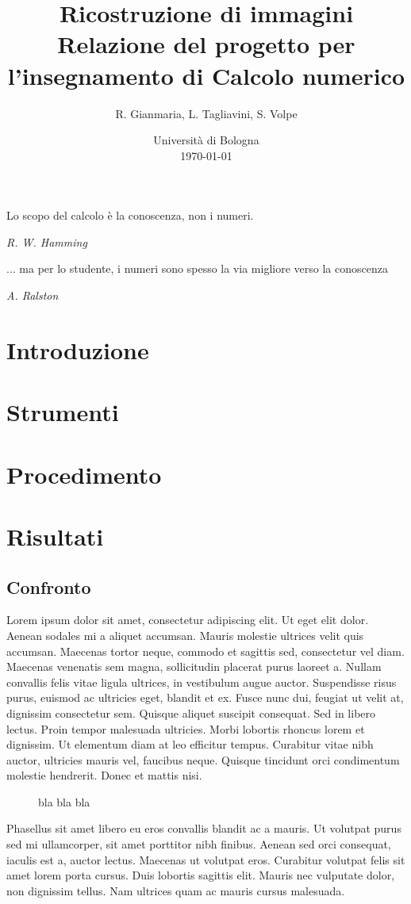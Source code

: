 \documentclass[a4paper]{article}
\title{
  Ricostruzione di immagini \\ \large Relazione del progetto per
  l'insegnamento di Calcolo numerico
}
\author{
  R. Gianmaria,
  L. Tagliavini,
  S. Volpe
}
\date{
	Universit\`a di Bologna \\
  \today
}
\begin{document}
\maketitle
\thispagestyle{empty}

\epigraph{Lo scopo del calcolo è la conoscenza, non i numeri.}
{\textit{R. W. Hamming}}
\epigraph{... ma per lo studente, i numeri sono spesso la via migliore verso la
conoscenza}
{\textit{A. Ralston}}

\section{Introduzione}

\section{Strumenti}

\section{Procedimento}

\section{Risultati}

\subsection{Confronto}

Lorem ipsum dolor sit amet, consectetur adipiscing elit. Ut eget elit dolor. Aenean sodales mi a aliquet accumsan. Mauris molestie ultrices velit quis accumsan. Maecenas tortor neque, commodo et sagittis sed, consectetur vel diam. Maecenas venenatis sem magna, sollicitudin placerat purus laoreet a. Nullam convallis felis vitae ligula ultrices, in vestibulum augue auctor. Suspendisse risus purus, euismod ac ultricies eget, blandit et ex. Fusce nunc dui, feugiat ut velit at, dignissim consectetur sem. Quisque aliquet suscipit consequat. Sed in libero lectus. Proin tempor malesuada ultricies. Morbi lobortis rhoncus lorem et dignissim. Ut elementum diam at leo efficitur tempus. Curabitur vitae nibh auctor, ultricies mauris vel, faucibus neque. Quisque tincidunt orci condimentum molestie hendrerit. Donec et mattis nisi.
\begin{figure}
   \begin{center}
       \vspace*{-1.1in}
       \centerline{\scalebox{1.3}{}}
   \end{center}
   \vspace*{-0.2in}
   \caption{bla bla bla}
\end{figure}
Phasellus sit amet libero eu eros convallis blandit ac a mauris. Ut volutpat purus sed mi ullamcorper, sit amet porttitor nibh finibus. Aenean sed orci consequat, iaculis est a, auctor lectus. Maecenas ut volutpat eros. Curabitur volutpat felis sit amet lorem porta cursus. Duis lobortis sagittis elit. Mauris nec vulputate dolor, non dignissim tellus. Nam ultrices quam ac mauris cursus malesuada.
\end{document}
